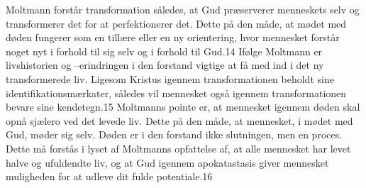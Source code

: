 Moltmann forstår transformation således, at Gud præserverer menneskets selv og transformerer det for at perfektionerer det. Dette på den måde, at mødet med døden fungerer som en tillære eller en ny orientering, hvor mennesket forstår noget nyt i forhold til sig selv og i forhold til Gud.14 Ifølge Moltmann er livshistorien og –erindringen i den forstand vigtige at få med ind i det ny transformerede liv. Ligesom Kristus igennem transformationen beholdt sine identifikationsmærkater, således vil mennesket også igennem transformationen bevare sine kendetegn.15 Moltmanns pointe er, at mennesket igennem døden skal opnå sjælero ved det levede liv. Dette på den måde, at mennesket, i mødet med Gud, møder sig selv. Døden er i den forstand ikke slutningen, men en proces. Dette må forstås i lyset af Moltmanns opfattelse af, at alle mennesket har levet halve og ufuldendte liv, og at Gud igennem apokatastasis giver mennesket muligheden for at udleve dit fulde potentiale.16 

